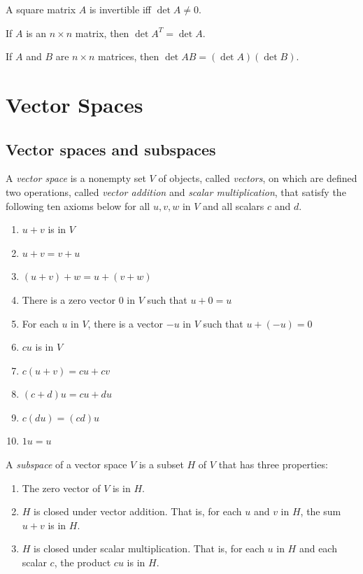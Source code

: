 \documentclass{article}
\begin{document}
\begin{thm}
    A square matrix \(A\) is invertible iff \(\det A\neq0\).
\end{thm}

\begin{thm}
    If \(A\) is an \(n\times n\) matrix, then \(\det A^T=\det A\).
\end{thm}

\begin{thm} 
    If \(A\) and \(B\) are \(n\times n\) matrices, then \(\det AB=\left(\det A\right)\left(\det B\right)\).
\end{thm}

\section{Vector Spaces}

\subsection{Vector spaces and subspaces}

\begin{defn}
    A \emph{vector space} is a nonempty set \(V\) of objects, called \emph{vectors}, on which are defined two operations, called \emph{vector addition} and \emph{scalar multiplication}, that satisfy the following ten axioms below for all \(u, v, w\) in \(V\) and all scalars \(c\) and \(d\).
\begin{enumerate}
    \item \(u+v\) is in \(V\)
    \item \(u+v=v+u\)
    \item \((u+v)+w=u+(v+w)\)
    \item There is a zero vector \(0\) in \(V\) such that \(u+0=u\)
    \item For each \(u\) in \(V\), there is a vector \(-u\) in \(V\) such that \(u+(-u)=0\)
    \item \(cu\) is in \(V\)
    \item \(c(u+v)=cu+cv\)
    \item \((c+d)u=cu+du\)
    \item \(c(du)=(cd)u\)
    \item \(1u=u\)
\end{enumerate}
\end{defn}

\begin{defn}
    A \emph{subspace} of a vector space \(V\) is a subset \(H\) of \(V\) that has three properties:
    \begin{enumerate}
        \item[a.] The zero vector of \(V\) is in \(H\).
        \item[b.] \(H\) is closed under vector addition. That is, for each \(u\) and \(v\) in \(H\), the sum \(u+v\) is in \(H\).
        \item[c.] \(H\) is closed under scalar multiplication. That is, for each \(u\) in \(H\) and each scalar \(c\), the product \(cu\) is in \(H\).
    \end{enumerate}
\end{defn}
\end{document}
